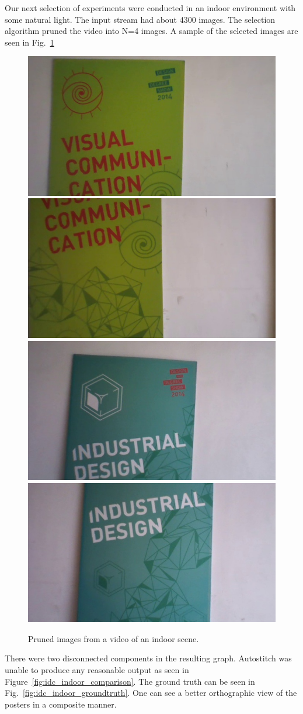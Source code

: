 Our next selection of experiments were conducted in an indoor
environment with some natural light.  The input stream had about 4300
images. The selection algorithm pruned the video into N=4 images. A
sample of the selected images are seen in Fig.~\ref{fig:idc_selected}

\begin{figure}
\centering
\includegraphics[width=0.22\linewidth]{figures/idc_indoor/selected/1.jpg}
\includegraphics[width=0.22\linewidth]{figures/idc_indoor/selected/2.jpg}
\includegraphics[width=0.22\linewidth]{figures/idc_indoor/selected/3.jpg}
\includegraphics[width=0.22\linewidth]{figures/idc_indoor/selected/4.jpg}
\caption{Pruned images from a video of an indoor scene.}
\label{fig:idc_selected}
\end{figure}

There were two disconnected components in the resulting graph.
Autostitch was unable to produce any reasonable output as seen in
Figure~\ref{fig:idc_indoor_comparison}.  The ground truth can be seen
in Fig.~\ref{fig:idc_indoor_groundtruth}.  One can see a better
orthographic view of the posters in a composite manner.


